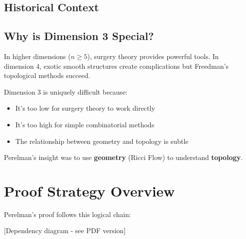 \subsection{Historical Context}


\subsection{Why is Dimension 3 Special?}

In higher dimensions ($n $), surgery theory provides powerful tools. In dimension 4, exotic smooth structures create complications but Freedman's topological methods succeed. 

Dimension 3 is uniquely difficult because:
\begin{itemize}
\item It's too low for surgery theory to work directly
\item It's too high for simple combinatorial methods
\item The relationship between geometry and topology is subtle
\end{itemize}

Perelman's insight was to use \textbf{geometry} (Ricci Flow) to understand \textbf{topology}.

\section{Proof Strategy Overview}

Perelman's proof follows this logical chain:

\begin{center}
[Dependency diagram - see PDF version]
\end{center}

